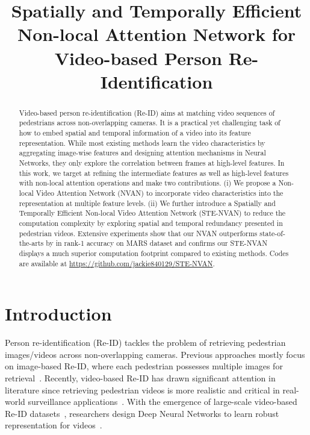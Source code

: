 \documentclass{bmvc2k}
\title{Spatially and Temporally Efficient Non-local Attention Network for Video-based Person Re-Identification}
\begin{document}
\maketitle

\begin{abstract}
Video-based person re-identification (Re-ID) aims at matching video sequences of pedestrians across non-overlapping cameras. 
It is a practical yet challenging task of how to embed spatial and temporal information of a video into its feature representation.
While most existing methods learn the video characteristics by aggregating image-wise features and designing attention mechanisms in Neural Networks, they only explore the correlation between frames at high-level features.
In this work, we target at refining the intermediate features as well as high-level features with non-local attention operations and make two contributions. 
(i) We propose a Non-local Video Attention Network (NVAN) to incorporate video characteristics into the representation at multiple feature levels.
(ii) We further introduce a Spatially and Temporally Efficient Non-local Video Attention Network (STE-NVAN) to reduce the computation complexity by exploring spatial and temporal redundancy presented in pedestrian videos. 
Extensive experiments show that our NVAN outperforms state-of-the-arts by  in rank-1 accuracy on MARS dataset and confirms our STE-NVAN displays a much superior computation footprint compared to existing methods. Codes are available at \url{https://github.com/jackie840129/STE-NVAN}.

\end{abstract}
\vspace{-3mm}


\section{Introduction}
\label{sec:intro}

Person re-identification (Re-ID) tackles the problem of retrieving pedestrian images/videos across non-overlapping cameras. 
Previous approaches mostly focus on image-based Re-ID, where each pedestrian possesses multiple images for retrieval~\cite{market,trip,cuhk03,viper,dukefeature,msmt17,grid,caviar}.
Recently, video-based Re-ID has drawn significant attention in literature since retrieving pedestrian videos is more realistic and critical in real-world surveillance applications~\cite{prid2011,ilidsvid,mars,dukevideo}.
With the emergence of large-scale video-based Re-ID datasets~\cite{mars,dukevideo}, researchers design Deep Neural Networks to learn robust representation for videos~\cite{mars,rcnn,forest,diversity,snip,sta}.
\end{document}

